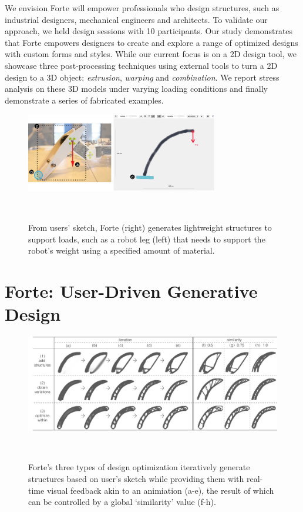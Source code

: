 We envision Forte will empower professionals who design structures, such as industrial designers, mechanical engineers and architects. To validate our approach, we held design sessions with 10 participants. Our study demonstrates that Forte empowers designers to create and explore a range of optimized designs with custom forms and styles. While our current focus is on a 2D design tool, we showcase three post-processing techniques using external tools to turn a 2D design to a 3D object: \textit{extrusion}, \textit{warping} and \textit{combination}. We report stress analysis on these 3D models under varying loading conditions and finally demonstrate a series of fabricated examples.


\begin{figure} [h]
  \centering
  \includegraphics[width=0.75\textwidth]{figures/design_scene}
  \caption{From users' sketch, Forte (right) generates lightweight structures to support loads, such as a robot leg (left) that needs to support the robot's weight using a specified amount of material.}~\label{fig:design_scene}
\end{figure}

\section{Forte: User-Driven Generative Design}

\begin{figure} [t]
  \centering
  \includegraphics[width=1\textwidth]{figures/all_the_techniques}
  \caption{Forte's three types of design optimization iteratively generate structures based on user's sketch while providing them with real-time visual feedback akin to an animiation (a-e), the result of which can be controlled by a global `similarity' value (f-h).}~\label{fig:techniques}
\end{figure}

